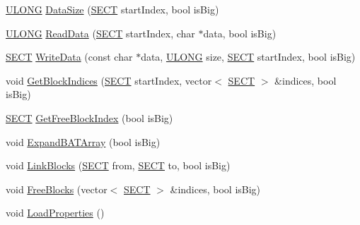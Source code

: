 \begin{DoxyCompactItemize}
\item 
\hyperlink{_basic_excel_8hpp_abe09d1bea023be6a07cbadde8e955435}{U\+L\+O\+N\+G} \hyperlink{class_y_compound_files_1_1_compound_file_a25ac7b658490f049a29f29eaabe777bc}{Data\+Size} (\hyperlink{_basic_excel_8hpp_a784c2e2144ab372c047faeeb0f6a9e6b}{S\+E\+C\+T} start\+Index, bool is\+Big)
\item 
\hyperlink{_basic_excel_8hpp_abe09d1bea023be6a07cbadde8e955435}{U\+L\+O\+N\+G} \hyperlink{class_y_compound_files_1_1_compound_file_a824ee7496bc9e849cbacab7860011703}{Read\+Data} (\hyperlink{_basic_excel_8hpp_a784c2e2144ab372c047faeeb0f6a9e6b}{S\+E\+C\+T} start\+Index, char $\ast$data, bool is\+Big)
\item 
\hyperlink{_basic_excel_8hpp_a784c2e2144ab372c047faeeb0f6a9e6b}{S\+E\+C\+T} \hyperlink{class_y_compound_files_1_1_compound_file_affe7d3e13bf06566b99a248fea564edd}{Write\+Data} (const char $\ast$data, \hyperlink{_basic_excel_8hpp_abe09d1bea023be6a07cbadde8e955435}{U\+L\+O\+N\+G} size, \hyperlink{_basic_excel_8hpp_a784c2e2144ab372c047faeeb0f6a9e6b}{S\+E\+C\+T} start\+Index, bool is\+Big)
\item 
void \hyperlink{class_y_compound_files_1_1_compound_file_aee1b28335f7d3dc945f58c1e3681482c}{Get\+Block\+Indices} (\hyperlink{_basic_excel_8hpp_a784c2e2144ab372c047faeeb0f6a9e6b}{S\+E\+C\+T} start\+Index, vector$<$ \hyperlink{_basic_excel_8hpp_a784c2e2144ab372c047faeeb0f6a9e6b}{S\+E\+C\+T} $>$ \&indices, bool is\+Big)
\item 
\hyperlink{_basic_excel_8hpp_a784c2e2144ab372c047faeeb0f6a9e6b}{S\+E\+C\+T} \hyperlink{class_y_compound_files_1_1_compound_file_ac0ae9f8fb054371f50055a4e47b83680}{Get\+Free\+Block\+Index} (bool is\+Big)
\item 
void \hyperlink{class_y_compound_files_1_1_compound_file_af3077ad279646c68ed346c41b81abbf1}{Expand\+B\+A\+T\+Array} (bool is\+Big)
\item 
void \hyperlink{class_y_compound_files_1_1_compound_file_ab81b7da57d0e41bbe74d5663552d45bb}{Link\+Blocks} (\hyperlink{_basic_excel_8hpp_a784c2e2144ab372c047faeeb0f6a9e6b}{S\+E\+C\+T} from, \hyperlink{_basic_excel_8hpp_a784c2e2144ab372c047faeeb0f6a9e6b}{S\+E\+C\+T} to, bool is\+Big)
\item 
void \hyperlink{class_y_compound_files_1_1_compound_file_acf3e12f09235fdc65b526f177e98d638}{Free\+Blocks} (vector$<$ \hyperlink{_basic_excel_8hpp_a784c2e2144ab372c047faeeb0f6a9e6b}{S\+E\+C\+T} $>$ \&indices, bool is\+Big)
\item 
void \hyperlink{class_y_compound_files_1_1_compound_file_ad179c227a22e45e9d8ede6c00da22887}{Load\+Properties} ()

\end{DoxyCompactItemize}
